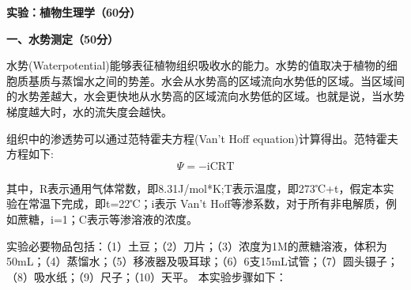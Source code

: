 \documentclass[a4paper, 12pt]{exam}
\begin{document}
{\large{\textbf{实验：植物生理学（60分）}}}

{\large{\textbf{一、水势测定（50分）}}}

水势(Waterpotential)能够表征植物组织吸收水的能力。水势的值取决于植物的细胞质基质与蒸馏水之间的势差。水会从水势高的区域流向水势低的区域。当区域间的水势差越大，水会更快地从水势高的区域流向水势低的区域。也就是说，当水势梯度越大时，水的流失度会越快。

组织中的渗透势可以通过范特霍夫方程(Van't Hoff equation)计算得出。范特霍夫方程如下:
\[\Psi=-\mathrm{iCRT}\]

其中，R表示通用气体常数，即8.31J/mol*K;T表示温度，即273℃+t，假定本实验在常温下完成，即t=22℃；i表示 Van't Hoff等渗系数，对于所有非电解质，例如蔗糖，i=1；C表示等渗溶液的浓度。

实验必要物品包括：（1）土豆；（2）刀片；（3）浓度为1M的蔗糖溶液，体积为50mL；（4）蒸馏水；（5）移液器及吸耳球；（6）6支15mL试管；（7）圆头镊子；（8）吸水纸；（9）尺子；（10）天平。
\vspace{2em}
本实验步骤如下：
\end{document}
